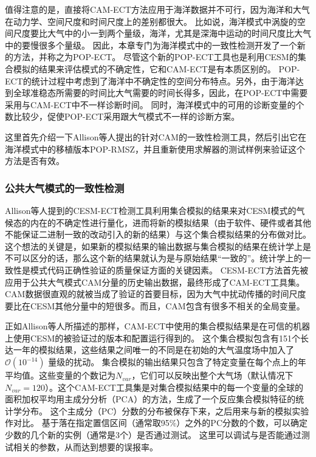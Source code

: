 值得注意的是，直接将CAM-ECT方法应用于海洋数据并不可行，因为海洋和大气在动力学、空间尺度和时间尺度上的差别都很大。
比如说，海洋模式中涡旋的空间尺度要比大气中的小一到两个量级，海洋，尤其是深海中运动的时间尺度比大气中的要慢很多个量级。
因此，本章专门为海洋模式中的一致性检测开发了一个新的方法，并称之为POP-ECT。 
尽管这个新的POP-ECT工具也是利用CESM的集合模拟的结果来评估模式的不确定性，它和CAM-ECT是有本质区别的。 
POP-ECT的统计过程中考虑到了海洋中不确定性的空间分布特点。另外，由于海洋达到全球准稳态所需要的时间比大气需要的时间长得多，因此，在POP-ECT中需要采用与CAM-ECT中不一样诊断时间。 
同时，海洋模式中的可用的诊断变量的个数比较少，促使POP-ECT采用跟大气模式不一样的诊断方案。 

这里首先介绍一下Allison等人提出的针对CAM的一致性检测工具，然后引出它在海洋模式中的移植版本POP-RMSZ，并且重新使用求解器的测试样例来验证这个方法是否有效。

\subsubsection{公共大气模式的一致性检测 }
\label{verify:CAM}
Allison等人\cite{baker2015}提到的CESM-ECT检测工具利用集合模拟的结果来对CESM模式的气候态的内在的不确定性进行量化，进而将新的模拟结果（由于软件、硬件或者其他不能保证二进制一致的改动引入的新的结果）与这个集合模拟结果的分布做对比。
这个想法的关键是，如果新的模拟结果的输出数据与集合模拟的结果在统计学上是不可以区分的话，那么这个新的结果就认为是与原始结果“一致的”。统计学上的一致性是模式代码正确性验证的质量保证方面的关键因素\cite{oberkampf2010}。
CESM-ECT方法首先被应用于公共大气模式CAM分量的历史输出数据，最终形成了CAM-ECT工具集。
CAM数据很直观的就被当成了验证的首要目标，因为大气中扰动传播的时间尺度要比在CESM其他分量中的短很多。而且，CAM包含有很多不相关的全局变量。 


 
正如Allison等人\cite{baker2015}所描述的那样，CAM-ECT中使用的集合模拟结果是在可信的机器上使用CESM的被验证过的版本和配置运行得到的。 
这个集合模拟包含有151个长达一年的模拟结果，这些结果之间唯一的不同是在初始的大气温度场中加入了$\mathcal{O}(10^{-14})$ 量级的扰动。 
集合模拟的输出结果只包含了特定变量在每个点上的年平均值。这些变量的个数记为$N_{var}$，它们可以反映出整个大气场（默认情况下 $N_{var}=120$）。这个CAM-ECT工具集是对集合模拟结果中的每一个变量的全球的面积加权平均用主成分分析（PCA）的方法，生成了一个反应集合模拟特征的统计学分布。
这个主成分（PC）分数的分布被保存下来，之后用来与新的模拟实验作对比。 
基于落在指定置信区间（通常取95$\%$）之外的PC分数的个数，可以确定少数的几个新的实例（通常是3个）是否通过测试。 
这里可以调试与是否能通过测试相关的参数，从而达到想要的误报率。


